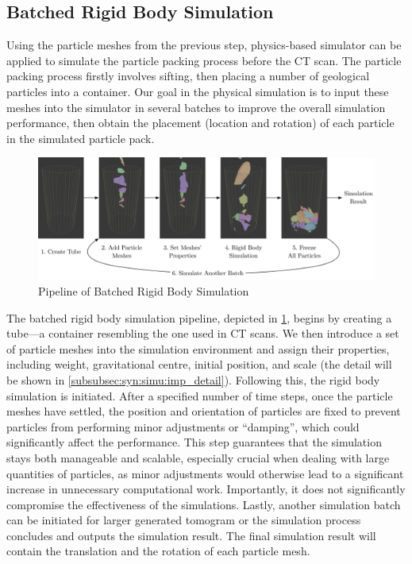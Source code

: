 \documentclass[preprint,12pt]{elsarticle}
\begin{document}
\subsection{Batched Rigid Body Simulation}
Using the particle meshes from the previous step, physics-based simulator can be applied to simulate the particle packing process before the CT scan. 
The particle packing process firstly involves sifting, then placing a number of geological particles into a container.
Our goal in the physical simulation is to input these meshes into the simulator in several batches to improve the overall simulation performance, then obtain the placement (location and rotation) of each particle in the simulated particle pack.
\begin{figure}[H]
    \includegraphics[width=\textwidth]{figures/pdf/simulation-pipeline.pdf}
    \caption{Pipeline of Batched Rigid Body Simulation}
    \label{fig:batched_rigid_body_simulation_pipeline}
\end{figure}
\par
The batched rigid body simulation pipeline, depicted in \cref{fig:batched_rigid_body_simulation_pipeline}, begins by creating a tube—a container resembling the one used in CT scans. 
We then introduce a set of particle meshes into the simulation environment and assign their properties, including weight, gravitational centre, initial position, and scale (the detail will be shown in \ref{subsubsec:syn:simu:imp_detail}). 
Following this, the rigid body simulation is initiated. 
After a specified number of time steps, once the particle meshes have settled, the position and orientation of particles are fixed to prevent particles from performing minor adjustments or ``damping'', which could significantly affect the performance.
This step guarantees that the simulation stays both manageable and scalable, especially crucial when dealing with large quantities of particles, as minor adjustments would otherwise lead to a significant increase in unnecessary computational work.
Importantly, it does not significantly compromise the effectiveness of the simulations.
Lastly, another simulation batch can be initiated for larger generated tomogram or the simulation process concludes and outputs the simulation result. 
The final simulation result will contain the translation and the rotation of each particle mesh.
\end{document}
